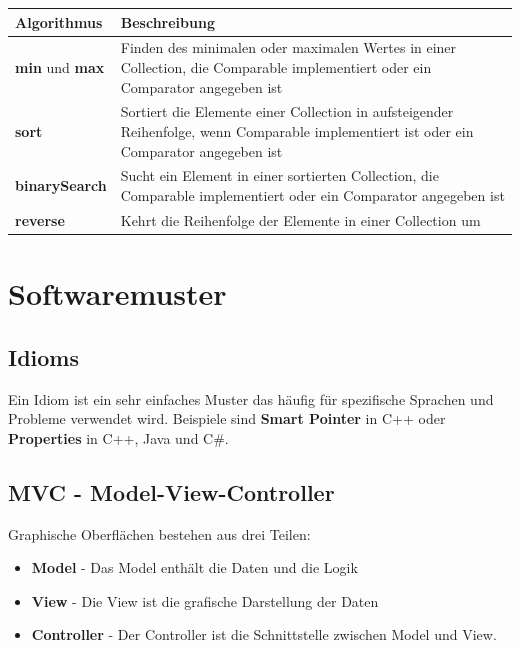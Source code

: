 \documentclass[12pt]{scrartcl}
\begin{document}
\begin{table}[H]
	\centering
	\begin{tabular}{ p{4cm} | p{11cm} }
		Algorithmus                   & Beschreibung                                                                                                                             \\
		\hline
		\textbf{min} und \textbf{max} & Finden des minimalen oder maximalen Wertes in einer Collection, die Comparable implementiert oder ein Comparator angegeben ist           \\
		\hline
		\textbf{sort}                 & Sortiert die Elemente einer Collection in aufsteigender Reihenfolge, wenn Comparable implementiert ist oder ein Comparator angegeben ist \\
		\hline
		\textbf{binarySearch}         & Sucht ein Element in einer sortierten Collection, die Comparable implementiert oder ein Comparator angegeben ist                         \\
		\hline
		\textbf{reverse}              & Kehrt die Reihenfolge der Elemente in einer Collection um                                                                                \\
	\end{tabular}
\end{table}

\section{Softwaremuster}
\subsection{Idioms}

Ein Idiom ist ein sehr einfaches Muster das häufig für spezifische Sprachen und Probleme verwendet wird. Beispiele sind
\textbf{Smart Pointer} in C++ oder \textbf{Properties} in C++, Java und C\#.

\subsection{MVC - Model-View-Controller}

Graphische Oberflächen bestehen aus drei Teilen:
\begin{itemize}
	\item \textbf{Model} - Das Model enthält die Daten und die Logik
	\item \textbf{View} - Die View ist die grafische Darstellung der Daten
	\item \textbf{Controller} - Der Controller ist die Schnittstelle zwischen Model und View.
\end{itemize}
\end{document}
